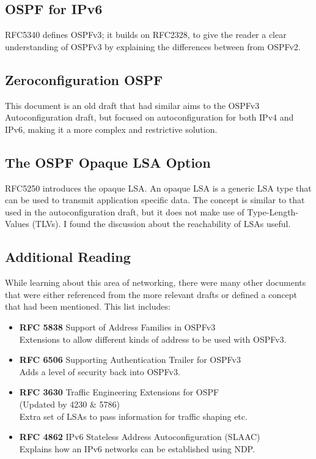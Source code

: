 \documentclass[12pt,a4paper,twoside]{report}
\begin{document}
\subsection{OSPF for IPv6}
RFC5340 defines OSPFv3\cite{rfc5340}; it builds on RFC2328, to give the
reader a clear understanding of OSPFv3 by explaining the differences between
from OSPFv2. 

\subsection{Zeroconfiguration OSPF}
This document\cite{draft-dimitri-zospf-00} is an old draft that had similar
aims to the OSPFv3 Autoconfiguration draft, but focused on autoconfiguration for
both IPv4 and IPv6, making it a more complex and restrictive solution. 

\subsection{The OSPF Opaque LSA Option}
RFC5250\cite{rfc5250} introduces the opaque LSA\@. An opaque LSA is a generic
LSA type that can be used to transmit application specific data. The concept is
similar to that used in the autoconfiguration draft, but it does not make use
of Type-Length-Values (TLVs). I found the
discussion about the reachability of LSAs useful.

\subsection{Additional Reading}
While learning about this area of networking, there were many other documents
that were either referenced from the more relevant drafts or defined a concept
that had been mentioned. This list includes:

\begin{itemize} 
  \item {\bf RFC 5838} Support of Address Families in OSPFv3 \cite{rfc5838}
	\\ Extensions to allow different kinds of address to be used with OSPFv3.
  
\item {\bf RFC 6506} Supporting Authentication Trailer for OSPFv3  \cite{rfc6506}
	\\ Adds a level of security back into OSPFv3.

	\item {\bf RFC 3630}  Traffic Engineering Extensions
	for OSPF \cite{rfc3630} 
	\\ (Updated by 4230 \& 5786) \cite{rfc4230} \cite{rfc5786} 
	\\ Extra set of LSAs to pass information for traffic shaping etc.\@
  
\item {\bf RFC 4862} IPv6 Stateless Address Autoconfiguration (SLAAC) \cite{rfc4862}
	\\ Explains how an IPv6 networks can be established using NDP.\@

\end{itemize}
\end{document}
